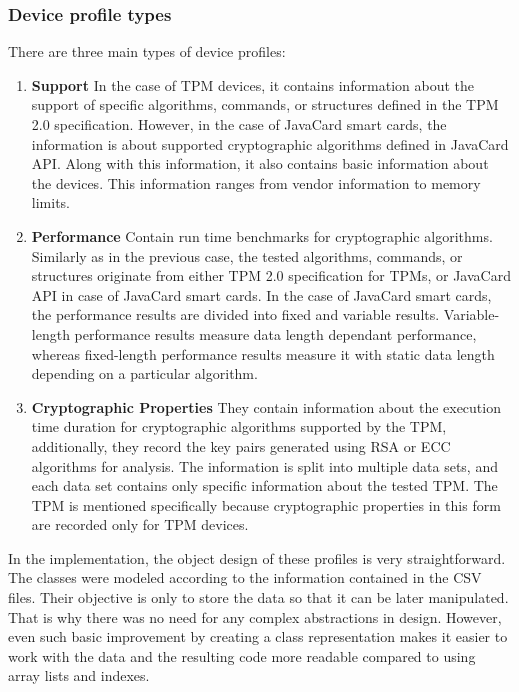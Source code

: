 \subsubsection{Device profile types}\label{sec:device-profiles}
There are three main types of device profiles:
\begin{enumerate}
    \item \textbf{Support} In the case of TPM devices, it contains information about the support of specific algorithms, commands, or structures defined in the TPM 2.0 specification. However, in the case of JavaCard smart cards, the information is about supported cryptographic algorithms defined in JavaCard API. Along with this information, it also contains basic information about the devices. This information ranges from vendor information to memory limits.
    
    \item \textbf{Performance} Contain run time benchmarks for cryptographic algorithms. Similarly as in the previous case, the tested algorithms, commands, or structures originate from either TPM 2.0 specification for TPMs, or JavaCard API in case of JavaCard smart cards. In the case of JavaCard smart cards, the performance results are divided into fixed and variable results. Variable-length performance results measure data length dependant performance, whereas fixed-length performance results measure it with static data length depending on a particular algorithm.
    
    \item \textbf{Cryptographic Properties} They contain information about the execution time duration for cryptographic algorithms supported by the TPM, additionally, they record the key pairs generated using RSA or ECC algorithms for analysis. The information is split into multiple data sets, and each data set contains only specific information about the tested TPM. The TPM is mentioned specifically because cryptographic properties in this form are recorded only for TPM devices.
\end{enumerate}

In the implementation, the object design of these profiles is very straightforward. The classes were modeled according to the information contained in the CSV files. Their objective is only to store the data so that it can be later manipulated. That is why there was no need for any complex abstractions in design. However, even such basic improvement by creating a class representation makes it easier to work with the data and the resulting code more readable compared to using array lists and indexes.

